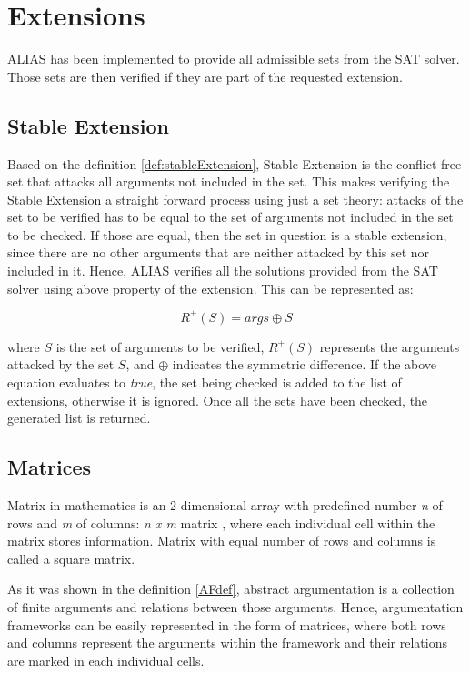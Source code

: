 \section{Extensions}
ALIAS has been implemented to provide all admissible sets from the SAT solver. Those sets are then verified if they are part of the requested extension. 


\subsection{Stable Extension} \label{section:stableExtension}
Based on the definition \ref{def:stableExtension}, Stable Extension is the conflict-free set that attacks all arguments not included in the set. This makes verifying the Stable Extension a straight forward process using just a set theory: attacks of the set to be verified has to be equal to the set of arguments not included in the set to be checked. If those are equal, then the set in question is a stable extension, since there are no other arguments that are neither attacked by this set nor included in it. Hence, ALIAS verifies all the solutions provided from the SAT solver using above property of the extension. This can be represented as: 

\begin{equation}
R^+(S) = args \oplus S
\end{equation}

where $S$ is the set of arguments to be verified, $R^+(S)$ represents the arguments attacked by the set $S$, and $\oplus$ indicates the symmetric difference. If the above equation evaluates to \textit{true}, the set being checked is added to the list of extensions, otherwise it is ignored. Once all the sets have been checked, the generated list is returned.

\subsection{Matrices}
Matrix in mathematics is an 2 dimensional array with predefined number \textit{n} of rows and \textit{m} of columns: \textit{n x m} matrix \citep{matrices}, where each individual cell within the matrix stores information. Matrix with equal number of rows and columns is called a square matrix. 

As it was shown in the definition \ref{AFdef}, abstract argumentation is a collection of finite arguments and relations between those arguments. Hence, argumentation frameworks can be easily represented in the form of matrices, where both rows and columns represent the arguments within the framework and their relations are marked in each individual cells. 

